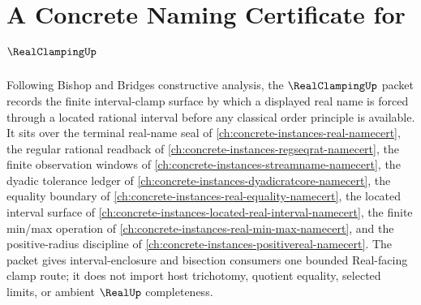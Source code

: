 \chapter{A Concrete Naming Certificate for $\RealClampingUp$}
\label{ch:concrete-instances-real-clamping-namecert}

Following Bishop and Bridges constructive analysis, the $\RealClampingUp$ packet records the finite interval-clamp surface by which a displayed real name is forced through a located rational interval before any classical order principle is available. It sits over the terminal real-name seal of \autoref{ch:concrete-instances-real-namecert}, the regular rational readback of \autoref{ch:concrete-instances-regseqrat-namecert}, the finite observation windows of \autoref{ch:concrete-instances-streamname-namecert}, the dyadic tolerance ledger of \autoref{ch:concrete-instances-dyadicratcore-namecert}, the equality boundary of \autoref{ch:concrete-instances-real-equality-namecert}, the located interval surface of \autoref{ch:concrete-instances-located-real-interval-namecert}, the finite min/max operation of \autoref{ch:concrete-instances-real-min-max-namecert}, and the positive-radius discipline of \autoref{ch:concrete-instances-positivereal-namecert}. The packet gives interval-enclosure and bisection consumers one bounded Real-facing clamp route; it does not import host trichotomy, quotient equality, selected limits, or ambient $\RealUp$ completeness.

